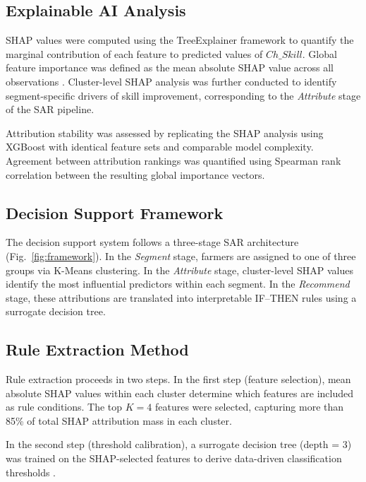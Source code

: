 \documentclass[3p,twocolumn,authoryear]{elsarticle}
\begin{document}
\subsection{Explainable AI Analysis}

SHAP values were computed using the TreeExplainer framework
\citep{lundberg2017} to quantify the marginal contribution of each feature
to predicted values of $Ch\_Skill$.
Global feature importance was defined as the mean absolute SHAP value
across all observations \citep{lundberg2020}.
Cluster-level SHAP analysis was further conducted to identify
segment-specific drivers of skill improvement, corresponding to the
\textit{Attribute} stage of the SAR pipeline.

Attribution stability was assessed by replicating the SHAP analysis using
XGBoost \citep{chen2016} with identical feature sets and comparable model
complexity.
Agreement between attribution rankings was quantified using Spearman
rank correlation between the resulting global importance vectors.

\subsection{Decision Support Framework}

The decision support system follows a three-stage SAR architecture
(Fig.~\ref{fig:framework}).
In the \textit{Segment} stage, farmers are assigned to one of three groups
via K-Means clustering.
In the \textit{Attribute} stage, cluster-level SHAP values identify the
most influential predictors within each segment.
In the \textit{Recommend} stage, these attributions are translated into
interpretable IF--THEN rules using a surrogate decision tree.

\subsection{Rule Extraction Method}

Rule extraction proceeds in two steps.
In the first step (feature selection), mean absolute SHAP values within
each cluster determine which features are included as rule conditions.
The top $K = 4$ features were selected, capturing more than 85\% of total
SHAP attribution mass in each cluster.

In the second step (threshold calibration), a surrogate decision tree
(depth = 3) was trained on the SHAP-selected features to derive
data-driven classification thresholds
\citep{guidotti2019,molnar2022}.
\end{document}
